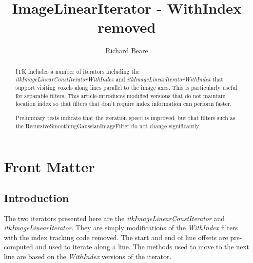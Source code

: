 \documentclass{InsightArticle}
\title{ImageLinearIterator - WithIndex removed}
\author{Richard Beare}
\begin{document}
\maketitle

\ifhtml
\chapter*{Front Matter\label{front}}
\fi


\begin{abstract}
\noindent
ITK includes a number of iterators including the {\em
itkImageLinearConstIteratorWithIndex} and {\em
itkImageLinearIteratorWithIndex} that support visiting voxels along
lines parallel to the image axes. This is particularly useful for
separable filters. This article introduces modified versions that do
not maintain location index so that filters that don't require index
information can perform faster. 

Preliminary tests indicate that the iteration speed is improved, but
that filters such as the RecursiveSmoothingGaussianImageFilter do not
change significantly.
\end{abstract}

\tableofcontents







\section{Introduction}
The two iterators presented here are the {\em
itkImageLinearConstIterator} and {\em itkImageLinearIterator}. They
are simply modifications of the {\em WithIndex} filters with the index
tracking code removed. The start and end of line offsets are
pre-computed and used to iterate along a line. The methods used to
move to the next line are based on the {\em WithIndex} versions of the
iterator.
\end{document}
